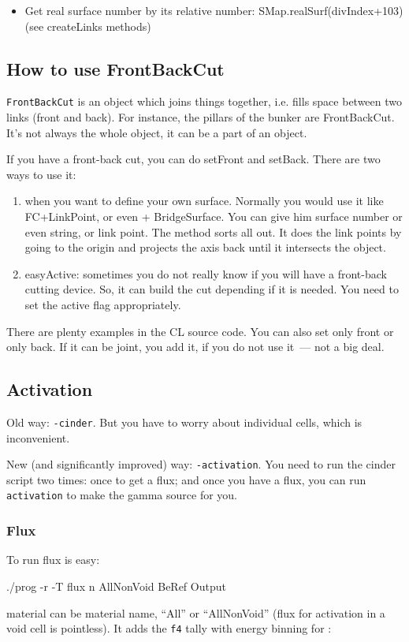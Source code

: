 \begin{itemize}
\item Get real surface number by its relative number: SMap.realSurf(divIndex+103) (see createLinks methods)
\end{itemize}

\subsection{How to use FrontBackCut}
{\tt FrontBackCut} is an object which joins things together, i.e. fills space between two links (front and back).
For instance, the pillars of the bunker are FrontBackCut.
It's not always the whole object, it can be a part of an object.

If you have a front-back cut, you can do setFront and setBack. There are two ways to use it:
\begin{enumerate}
\item when you want to define your own surface. Normally you would use it like FC+LinkPoint, or even + BridgeSurface.
  You can give him surface number or even string, or link point. The method sorts all out.
  It does the link points by going to the origin and projects the axis back until it intersects the object.
\item easyActive: sometimes you do not really know if you will have a front-back cutting device. So, it can build the cut depending if it is needed.
  You need to set the active flag appropriately.
\end{enumerate}
There are plenty examples in the CL source code. You can also set only front or only back.
If it can be joint, you add it, if you do not use it~--- not a big deal.


\subsection{Activation}
Old way: {\tt -cinder}. But you have to worry about individual cells, which is inconvenient.

New (and significantly improved) way: {\tt -activation}.
You need to run the cinder script two times: once to get a flux; and once you have a flux, you can run {\tt activation} to make the gamma source for you.

\subsubsection{Flux}
To run flux is easy:
\begin{bash}
./prog -r -T flux n AllNonVoid BeRef Output
\end{bash}
material can be material name, ``All'' or ``AllNonVoid'' (flux for activation in a void cell is pointless).
It adds the {\tt f4} tally with energy binning for \cinder:

